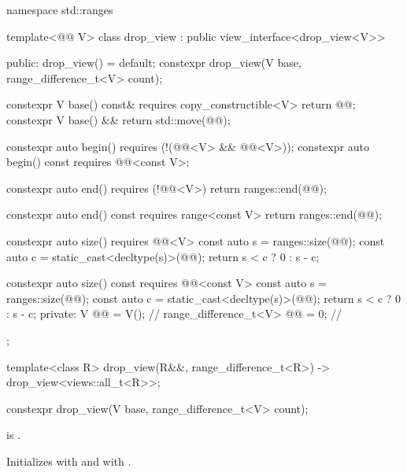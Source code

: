 %
%
%
%
\begin{codeblock}
namespace std::ranges {
  template<@@ V>
  class drop_view : public view_interface<drop_view<V>> {
  public:
    drop_view() = default;
    constexpr drop_view(V base, range_difference_t<V> count);

    constexpr V base() const& requires copy_constructible<V> { return @@; }
    constexpr V base() && { return std::move(@@); }

    constexpr auto begin()
      requires (!(@@<V> && @@<V>));
    constexpr auto begin() const
      requires @@<const V>;

    constexpr auto end()
      requires (!@@<V>)
    { return ranges::end(@@); }

    constexpr auto end() const
      requires range<const V>
    { return ranges::end(@@); }

    constexpr auto size()
      requires @@<V>
    {
      const auto s = ranges::size(@@);
      const auto c = static_cast<decltype(s)>(@@);
      return s < c ? 0 : s - c;
    }

    constexpr auto size() const
      requires @@<const V>
    {
      const auto s = ranges::size(@@);
      const auto c = static_cast<decltype(s)>(@@);
      return s < c ? 0 : s - c;
    }
  private:
    V @@ = V();                              // \expos
    range_difference_t<V> @@ = 0;           // \expos
  };

  template<class R>
    drop_view(R&&, range_difference_t<R>) -> drop_view<views::all_t<R>>;
}
\end{codeblock}

%
\begin{itemdecl}
constexpr drop_view(V base, range_difference_t<V> count);
\end{itemdecl}

\begin{itemdescr}
\pnum
\expects
{} is .

\pnum
\effects
Initializes  with  and
 with .
\end{itemdescr}

